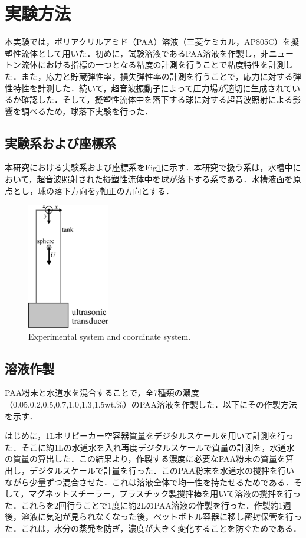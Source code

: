\section{実験方法}
\label{sec:methods}
本実験では，ポリアクリルアミド（PAA）溶液（三菱ケミカル，AP805C）を擬塑性流体として用いた．初めに，試験溶液であるPAA溶液を作製し，非ニュートン流体における指標の一つとなる粘度の計測を行うことで粘度特性を計測した．また，応力と貯蔵弾性率，損失弾性率の計測を行うことで，応力に対する弾性特性を計測した．続いて，超音波振動子によって圧力場が適切に生成されているか確認した．そして，擬塑性流体中を落下する球に対する超音波照射による影響を調べるため，球落下実験を行った．

\subsection{実験系および座標系}
\label{sec:exp-system}
本研究における実験系および座標系をFig\ref{fig:system}に示す．本研究で扱う系は，水槽中において，超音波照射された擬塑性流体中を球が落下する系である．水槽液面を原点とし，球の落下方向をy軸正の方向とする．

\begin{figure}[H]
    \centering
    \includegraphics[width=0.32\textwidth]{./2-Methods/device-coordinate.eps}
    \caption{Experimental system and coordinate system.}
    \label{fig:system}
\end{figure}

\subsection{溶液作製}
PAA粉末と水道水を混合することで，全7種類の濃度（0.05,0.2,0.5,0.7,1.0,1.3,1.5wt.\%）のPAA溶液を作製した．以下にその作製方法を示す．

はじめに，1Lポリビーカー空容器質量をデジタルスケールを用いて計測を行った．そこに約1Lの水道水を入れ再度デジタルスケールで質量の計測を，水道水の質量の算出した．この結果より，作製する濃度に必要なPAA粉末の質量を算出し，デジタルスケールで計量を行った．このPAA粉末を水道水の攪拌を行いながら少量ずつ混合させた．これは溶液全体で均一性を持たせるためである．そして，マグネットスチーラー，プラスチック製攪拌棒を用いて溶液の攪拌を行った．これらを2回行うことで1度に約2LのPAA溶液の作製を行った．作製約1週後，溶液に気泡が見られなくなった後，ペットボトル容器に移し密封保管を行った．これは，水分の蒸発を防ぎ，濃度が大きく変化することを防ぐためである．

